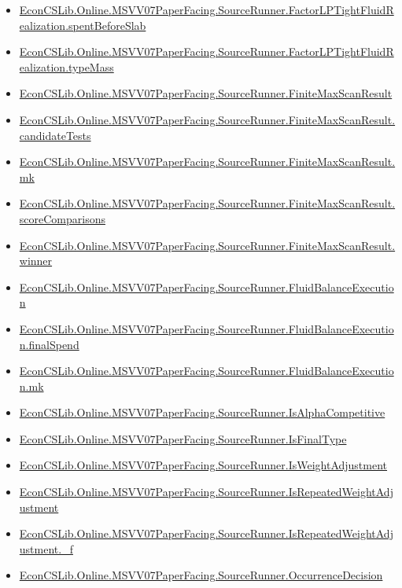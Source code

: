 \documentclass[10pt]{article}
\begin{document}
\begin{itemize}[leftmargin=1.2em]
\begin{itemize}[leftmargin=1.2em]
\item \hyperlink{library-prerequisite-19eef77577928ba0}{EconCSLib.Online.MSVV07PaperFacing.SourceRunner.FactorLPTightFluidRealization.spentBeforeSlab}
\item \hyperlink{library-prerequisite-f3e2f42818de4fbf}{EconCSLib.Online.MSVV07PaperFacing.SourceRunner.FactorLPTightFluidRealization.typeMass}
\item \hyperlink{library-prerequisite-e479e7eaaee6aeda}{EconCSLib.Online.MSVV07PaperFacing.SourceRunner.FiniteMaxScanResult}
\item \hyperlink{library-prerequisite-8d91949a0ced67bb}{EconCSLib.Online.MSVV07PaperFacing.SourceRunner.FiniteMaxScanResult.candidateTests}
\item \hyperlink{library-prerequisite-93c897243655e8ca}{EconCSLib.Online.MSVV07PaperFacing.SourceRunner.FiniteMaxScanResult.mk}
\item \hyperlink{library-prerequisite-f6960d62adaa9090}{EconCSLib.Online.MSVV07PaperFacing.SourceRunner.FiniteMaxScanResult.scoreComparisons}
\item \hyperlink{library-prerequisite-f644bf3cce15f398}{EconCSLib.Online.MSVV07PaperFacing.SourceRunner.FiniteMaxScanResult.winner}
\item \hyperlink{library-prerequisite-f866036f132661ac}{EconCSLib.Online.MSVV07PaperFacing.SourceRunner.FluidBalanceExecution}
\item \hyperlink{library-prerequisite-5d6a15aa4f9fa3de}{EconCSLib.Online.MSVV07PaperFacing.SourceRunner.FluidBalanceExecution.finalSpend}
\item \hyperlink{library-prerequisite-1138000c2ade81fa}{EconCSLib.Online.MSVV07PaperFacing.SourceRunner.FluidBalanceExecution.mk}
\item \hyperlink{library-prerequisite-9296d5f4232d3e2c}{EconCSLib.Online.MSVV07PaperFacing.SourceRunner.IsAlphaCompetitive}
\item \hyperlink{library-prerequisite-5976454f03ab3e1c}{EconCSLib.Online.MSVV07PaperFacing.SourceRunner.IsFinalType}
\item \hyperlink{library-prerequisite-b630624a7a796206}{EconCSLib.Online.MSVV07PaperFacing.SourceRunner.IsWeightAdjustment}
\item \hyperlink{library-prerequisite-8321ae57a43b8c07}{EconCSLib.Online.MSVV07PaperFacing.SourceRunner.IsRepeatedWeightAdjustment}
\item \hyperlink{library-prerequisite-fe8507dfa5599328}{EconCSLib.Online.MSVV07PaperFacing.SourceRunner.IsRepeatedWeightAdjustment.\_f}
\item \hyperlink{library-prerequisite-33445eedaac18e89}{EconCSLib.Online.MSVV07PaperFacing.SourceRunner.OccurrenceDecision}

\end{itemize}
\end{itemize}
\end{document}
